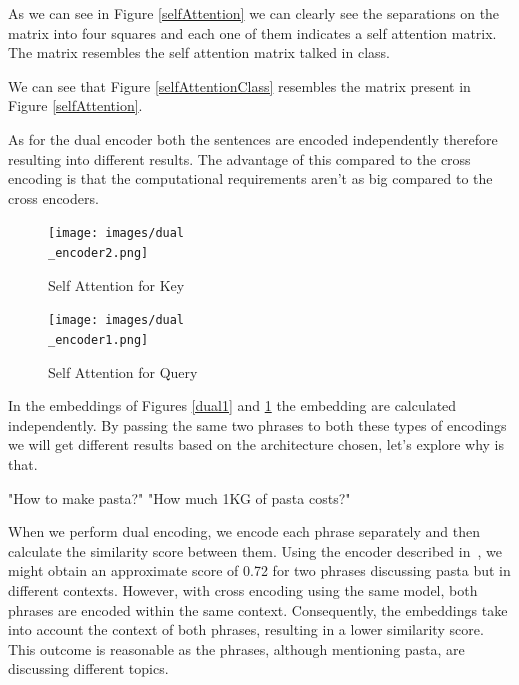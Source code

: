 \documentclass[runningheads]{llncs}
\begin{document}
As we can see in Figure \ref{selfAttention} we can clearly see the separations on the matrix into four squares and each one of them indicates a self attention matrix. The matrix resembles the self attention matrix talked in class.

We can see that Figure \ref{selfAttentionClass} resembles the matrix present in Figure \ref{selfAttention}.

 As for the dual encoder both the sentences are encoded independently therefore resulting into different results. The advantage of this compared to the cross encoding is that the computational requirements aren't as big compared to the cross encoders. 

\begin{figure}[htbp]
    \centering
    \begin{minipage}{0.50\textwidth}
        \centering
        \texttt{[image: images/dual\\\_encoder2.png]}
        \caption{Self Attention for Key}
         \label{dual1}
    \end{minipage}\hfill
    \begin{minipage}{0.50\textwidth}
        \centering
        \texttt{[image: images/dual\\\_encoder1.png]}
        \caption{Self Attention for Query}
         \label{dual2}
    \end{minipage}
\end{figure}

In the embeddings of Figures \ref{dual1} and \ref{dual2} the embedding are calculated independently.
By passing the same two phrases to both these types of encodings we will get different results based on the architecture chosen, let's explore why is that.\\[5pt]

\hspace{0.5cm} %
\begin{minipage}{1.2\textwidth} %
\begin{dialogue}
 "How to make pasta?"
 "How much 1KG of pasta costs?"\\[5pt]
\end{dialogue}
\end{minipage}

When we perform dual encoding, we encode each phrase separately and then calculate the similarity score between them. Using the encoder described in~\cite{reimers-2019-sentence-bert}, we might obtain an approximate score of 0.72 for two phrases discussing pasta but in different contexts. However, with cross encoding using the same model, both phrases are encoded within the same context. Consequently, the embeddings take into account the context of both phrases, resulting in a lower similarity score. This outcome is reasonable as the phrases, although mentioning pasta, are discussing different topics.
\end{document}
